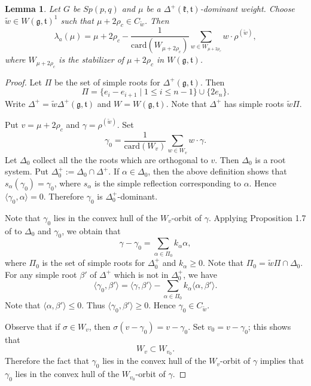 \documentclass[11pt]{amsart}
\theoremstyle{plain}
\newtheorem{lemma}[thm]{Lemma}
\theoremstyle{definition}
\newcommand{\frg}{\mathfrak{g}}
\newcommand{\frk}{\mathfrak{k}}
\newcommand{\frt}{\mathfrak{t}}
\begin{document}
 \begin{lemma}\label{lambda-1}
  Let $G$ be $Sp(p, q)$ and $\mu$ be a $\Delta^+(\frk,\frt)$-dominant weight. Choose $\widetilde{w}\in W(\frg,\frt)^1$ such that $\mu+2\rho_c\in C_{\widetilde{w}}$. Then
 \[\lambda_a(\mu)=\mu+2\rho_c-\dfrac{1}{\mathrm{card}(W_{\mu+2\rho_c})}\sum_{w\in W_{\mu+2\rho_c}}w\cdot \rho^{(\widetilde{w})},\]
 where $W_{\mu+2\rho_c}$ is the stabilizer of $\mu+2\rho_c$ in $W(\frg,\frt)$.
 \end{lemma}
 \begin{proof}
Let $\Pi$ be the set of simple roots for $\Delta^+(\frg,\frt)$. Then
 	 \[\Pi=\{e_i-e_{i+1}\mid\mbox{$1\le i\le n-1$}\}\cup\{2e_n\}.\]
Write $\Delta^+=\widetilde{w}\Delta^+(\frg,\frt)$ and $W=W(\frg,\frt)$. Note that $\Delta^+$ has simple roots $\widetilde{w}\Pi$.

Put $v=\mu+2\rho_c$ and $\gamma=\rho^{(\widetilde{w})}$. Set
 	\[
 	\gamma_0=\dfrac{1}{\mathrm{card}(W_v)}\sum_{w\in W_v}w\cdot \gamma.
 	\]
 	Let $\Delta_0$ collect all the the roots which are orthogonal to $v$. Then $\Delta_0$ is a root system. Put $\Delta_0^+:=\Delta_0\cap \Delta^+$. If $\alpha\in\Delta_0$, then the above definition shows that $s_\alpha(\gamma_0)=\gamma_0$, where $s_\alpha$ is the simple reflection corresponding to $\alpha$. Hence $\langle\gamma_0,\alpha\rangle=0$. Therefore $\gamma_0$ is $\Delta_0^+$-dominant.
 	
 	 Note that $\gamma_0$ lies in the convex hull of the $W_v$-orbit of $\gamma$. Applying Proposition 1.7 of \cite{SV} to $\Delta_0$ and $\gamma_0$, we obtain that
 	 \[\gamma-\gamma_0=\sum_{\alpha\in\Pi_0}k_\alpha\alpha,\]
 where $\Pi_0$ is the set of simple roots for $\Delta_0^+$ and $k_\alpha\ge 0$. Note that $\Pi_0=\widetilde{w}\Pi\cap \Delta_0$.
  For any simple root $\beta'$ of $\Delta^+$ which is not in $\Delta_0^+$, we have
 	 \[\langle\gamma_0, \beta'\rangle=\langle\gamma, \beta' \rangle-\sum_{\alpha\in\Pi_0}k_\alpha \langle\alpha, \beta'\rangle.\]
 Note that  $\langle \alpha, \beta'\rangle\leq 0$. Thus $\langle \gamma_0,\beta' \rangle\ge 0$. Hence $\gamma_0\in C_{\widetilde{w}}$.
 	
 	 Observe that if $\sigma\in W_v$, then $\sigma(v-\gamma_0)=v-\gamma_0$. Set $v_0=v-\gamma_0$; this shows that
 	 \[
 	 W_v\subset W_{v_0}.
 	 \]
 	 Therefore the fact that $\gamma_0$ lies in the convex hull of the $W_v$-orbit of $\gamma$ implies that $\gamma_0$ lies in the convex hull of the $W_{v_0}$-orbit of $\gamma$.
 	

\end{proof}
\end{document}
